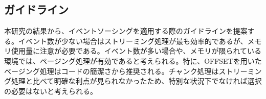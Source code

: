 \documentclass[../../main]{subfiles}
\begin{document}
    \subsection{ガイドライン}\label{subsec:consideration-guideline}

    本研究の結果から、イベントソーシングを適用する際のガイドラインを提案する。イベント数が少ない場合はストリーミング処理が最も効率的であるが、メモリ使用量に注意が必要である。イベント数が多い場合や、メモリが限られている環境では、ページング処理が有効であると考えられる。特に、OFFSETを用いたページング処理はコードの簡潔さから推奨される。チャンク処理はストリーミング処理と比べて明確な利点が見られなかったため、特別な状況下でなければ選択の必要はないと考えられる。

    \clearpage
\end{document}

